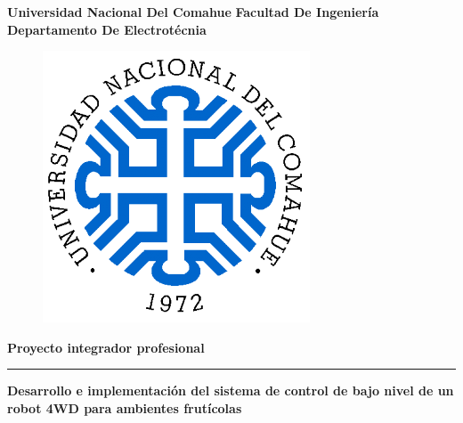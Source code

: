     \begin{center}
        {\LARGE \textbf{Universidad Nacional Del Comahue}} 
        \vspace{4mm}
        {\LARGE \textbf{Facultad De Ingeniería}}
        {\LARGE \textbf{Departamento De Electrotécnia}}\\ %
        \vspace{5mm} %
        \begin{figure}[h]
            \centering
            \includegraphics[scale = 1.3]{img/LogoUNCO.png} %
        \end{figure}
        \vspace{1cm}
        {\large \textbf{Proyecto integrador profesional}}
        \rule{150mm}{0.1mm} %
        \vspace{5mm}

        {\LARGE \textbf{Desarrollo e implementación del sistema de control de bajo nivel de un robot 4WD para ambientes frutícolas}}

    \end{center}